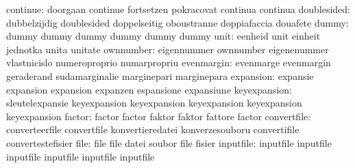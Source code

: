                  continue: doorgaan                  continue
                           fortsetzen                pokracovat
                           continua                  continua
              doublesided: dubbelzijdig              doublesided
                           doppelseitig              oboustranne
                           doppiafaccia              douafete
                    dummy: dummy                     dummy
                           dummy                     dummy
                           dummy                     dummy
                     unit: eenheid                   unit
                           einheit                   jednotka
                           unita                     unitate
                ownnumber: eigennummer               ownnumber
                           eigenenummer              vlastnicislo
                           numeroproprio             numarpropriu
               evenmargin: evenmarge                 evenmargin
                           geraderand                sudamarginalie
                           marginepari               marginepara
                expansion: expansie                  expansion
                           expansion                 expanzen
                           espansione                expansiune
keyexpansion: sleutelexpansie                  keyexpansion
              keyexpansion                     keyexpansion
              keyexpansion                     keyexpansion
                   factor: factor                    factor
                           faktor                    faktor
                           fattore                   factor
              convertfile: converteerfile            convertfile
                           konvertieredatei          konverzesouboru
                           convertifile              convertestefisier
                     file: file                      file
                           datei                     soubor
                           file                      fisier
                inputfile: inputfile                 inputfile
                           inputfile                 inputfile
                           inputfile                 inputfile %
